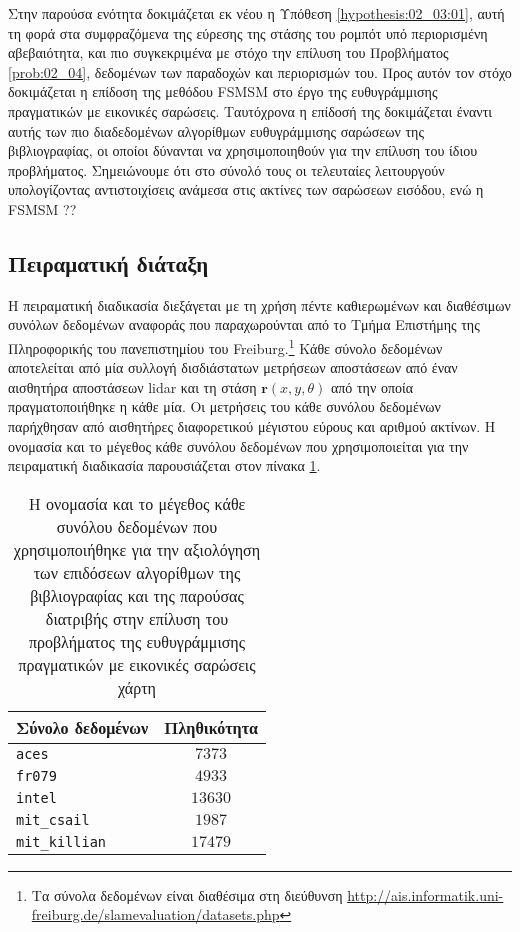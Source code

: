 Στην παρούσα ενότητα δοκιμάζεται εκ νέου η Υπόθεση \ref{hypothesis:02_03:01},
αυτή τη φορά στα συμφραζόμενα της εύρεσης της στάσης του ρομπότ υπό
περιορισμένη αβεβαιότητα, και πιο συγκεκριμένα με στόχο την επίλυση του
Προβλήματος \ref{prob:02_04}, δεδομένων των παραδοχών και περιορισμών του.
Προς αυτόν τον στόχο δοκιμάζεται η επίδοση της μεθόδου FSMSM στο έργο της
ευθυγράμμισης πραγματικών με εικονικές σαρώσεις. Ταυτόχρονα η επίδοσή της
δοκιμάζεται έναντι αυτής των πιο διαδεδομένων αλγορίθμων ευθυγράμμισης σαρώσεων
της βιβλιογραφίας, οι οποίοι δύνανται να χρησιμοποιηθούν για την επίλυση του
ίδιου προβλήματος. Σημειώνουμε ότι στο σύνολό τους οι τελευταίες λειτουργούν
υπολογίζοντας αντιστοιχίσεις ανάμεσα στις ακτίνες των σαρώσεων εισόδου, ενώ η
FSMSM ??

\subsection{Πειραματική διάταξη}
\label{subsection:02_04_05:01}

Η πειραματική διαδικασία διεξάγεται με τη χρήση πέντε καθιερωμένων και
διαθέσιμων συνόλων δεδομένων αναφοράς που παραχωρούνται από το Τμήμα Επιστήμης
της Πληροφορικής του πανεπιστημίου του Freiburg.\footnote{Τα σύνολα δεδομένων
είναι διαθέσιμα στη διεύθυνση
\url{http://ais.informatik.uni-freiburg.de/slamevaluation/datasets.php}} Κάθε
σύνολο δεδομένων αποτελείται από μία συλλογή δισδιάστατων μετρήσεων
αποστάσεων από έναν αισθητήρα αποστάσεων lidar και τη στάση
$\bm{r}(x,y,\theta)$ από την οποία πραγματοποιήθηκε η κάθε μία. Οι μετρήσεις
του κάθε συνόλου δεδομένων παρήχθησαν από αισθητήρες διαφορετικού μέγιστου
εύρους και αριθμού ακτίνων. Η ονομασία και το μέγεθος κάθε συνόλου δεδομένων
που χρησιμοποιείται για την πειραματική διαδικασία παρουσιάζεται στον πίνακα
\ref{tbl:02:04_05:dataset_sizes}.

\begin{table}\centering
  \begin{tabular}{lc}
  Σύνολο δεδομένων      & Πληθικότητα  \\  \toprule
  \texttt{aces}         & $7373$       \\
  \texttt{fr079}        & $4933$       \\
  \texttt{intel}        & $13630$      \\
  \texttt{mit\_csail}   & $1987$       \\
  \texttt{mit\_killian} & $17479$      \\  \bottomrule
  \end{tabular}
\caption{\small Η ονομασία και το μέγεθος κάθε συνόλου δεδομένων που
         χρησιμοποιήθηκε για την αξιολόγηση των επιδόσεων αλγορίθμων της
         βιβλιογραφίας και της παρούσας διατριβής στην επίλυση του προβλήματος
         της ευθυγράμμισης πραγματικών με εικονικές σαρώσεις χάρτη}
  \label{tbl:02:04_05:dataset_sizes}
\end{table}

